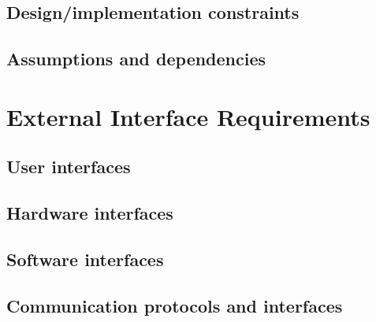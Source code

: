 \documentclass[10pt]{article}
\begin{document}
\lipsum[10]

\subsection{Design/implementation constraints}

\lipsum[10]

\subsection{Assumptions and dependencies}

\lipsum[10]








\section{External Interface Requirements} 

\subsection{User interfaces}

\lipsum[10]

\subsection{Hardware interfaces}

\lipsum[10]

\subsection{Software interfaces}

\lipsum[10]

\subsection{Communication protocols and interfaces}

\lipsum[10]



\end{document}
